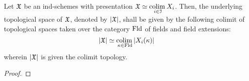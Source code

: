             \begin{definition} \label{def: underlying_topological_spaces_of_ind_schemes}
                Let $\mathfrak{X}$ be an ind-schemes with presentation $\mathfrak{X} \simeq \underset{i \in \mathcal{I}}{\operatorname{colim} \:} X_i$. Then, the underlying topological space of $\mathfrak{X}$, denoted by $|\mathfrak{X}|$, shall be given by the following colimit of topological spaces taken over the category $\mathrm{Fld}$ of fields and field extensions:
                    $$|\mathfrak{X}| \simeq \underset{\kappa \in \mathrm{Fld}}{\operatorname{colim} \:} |X_i(\kappa)|$$
                wherein $|\mathfrak{X}|$ is given the colimit topology.
            \end{definition}
            \begin{definition} \label{def: pro_ringed_spaces}
                
            \end{definition}
            \begin{proposition} \label{prop: ind_schemes_are_locally_pro_ringed_spaces}
                
            \end{proposition}
                \begin{proof}
                    
                \end{proof}
    
